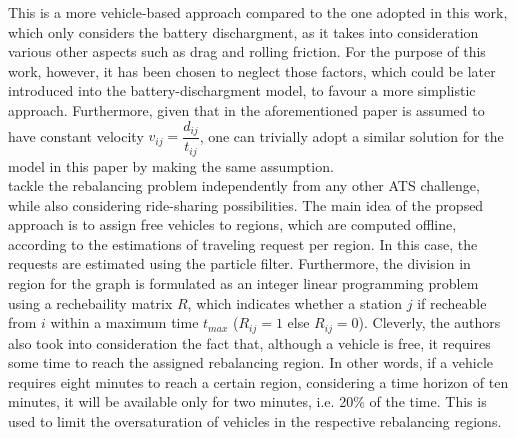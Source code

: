 This is a more vehicle-based approach compared to the one adopted in this work, which only considers the battery dischargment, as it takes into consideration various other aspects such as drag and rolling friction. For the purpose of this work, however, it has been chosen to neglect those factors, which could be later introduced into the battery-dischargment model, to favour a more simplistic approach. Furthermore, given that in the aforementioned paper is assumed to have constant velocity $v_{ij} = \dfrac{d_{ij}}{t_{ij}}$, one can trivially adopt a similar solution for the model in this paper by making the same assumption. \\
 tackle the rebalancing problem independently from any other ATS challenge, while also considering ride-sharing possibilities. The main idea of the propsed approach is to assign free vehicles to regions, which are computed offline, according to the estimations of traveling request per region. In this case, the requests are estimated using the particle filter. Furthermore, the division in region for the graph is formulated as an integer linear programming problem using a rechebaility matrix $R$, which indicates whether a station $j$ if recheable from $i$ within a maximum time $t_{max}$ ($R_{ij} = 1$ else $R_{ij} = 0$). Cleverly, the authors also took into consideration the fact that, although a vehicle is free, it requires some time to reach the assigned rebalancing region. In other words, if a vehicle requires eight minutes to reach a certain region, considering a time horizon of ten minutes, it will be available only for two minutes, i.e. 20\% of the time. This is used to limit the oversaturation of vehicles in the respective rebalancing regions.  


